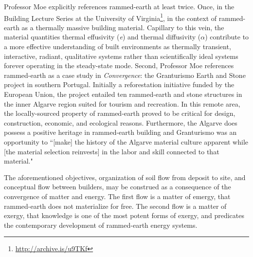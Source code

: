 Professor Moe explicitly references rammed-earth at least twice. Once, in the Building Lecture Series at the University of Virginia\footnote{\url{http://archive.is/u9TKf}}, in the context of rammed-earth as a thermally massive building material. Capillary to this vein, the material quantities thermal effusivity (\textit{e}) and thermal diffusivity ($\alpha$) contribute to a more effective understanding of built environments as thermally transient, interactive, radiant, qualitative systems rather than scientifically ideal systems forever operating in the steady-state mode. Second, Professor Moe references rammed-earth as a case study in \textit{Convergence}: the Granturismo Earth and Stone project in southern Portugal. Initially a reforestation initiative funded by the European Union, the project entailed ten rammed-earth and stone structures in the inner Algarve region suited for tourism and recreation. In this remote area, the locally-sourced property of rammed-earth proved to be critical for design, construction, economic, and ecological reasons. Furthermore, the Algarve does possess a positive heritage in rammed-earth building and Granturismo was an opportunity to ``[make] the history of the Algarve material culture apparent while [the material selection reinvests] in the labor and skill connected to that material." \cite{MOECONVERGENCE}

The aforementioned objectives, organization of soil flow from deposit to site, and conceptual flow between builders, may be construed as a consequence of the convergence of matter and energy. The first flow is a matter of emergy, that rammed-earth does not materialize for free. The second flow is a matter of exergy, that knowledge is one of the most potent forms of exergy, and predicates the contemporary development of rammed-earth energy systems.
